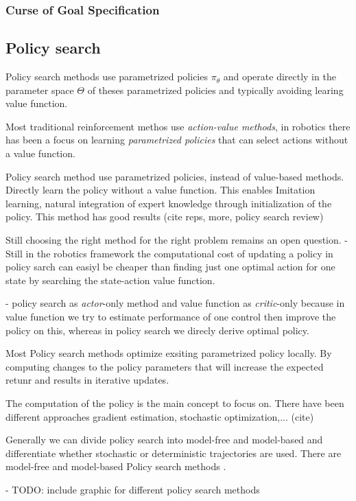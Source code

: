 \subsubsection{Curse of Goal Specification}

\subsection{Policy search}
Policy search methods use parametrized policies $\pi_{\theta}$ and operate
directly in the parameter space $\Theta$ of theses parametrized policies and
typically avoiding learing value function.

Most traditional reinforcement methos use \textit{action-value methods}, in robotics
there has been a focus on learning \textit{parametrized policies} that can select
actions without a value function.

Policy search method use parametrized policies, instead
of value-based methods. Directly learn the policy without a value function.
This enables Imitation learning, natural integration of expert knowledge through
initialization of the policy.
This method has good results (cite reps, more, policy search review)

Still choosing the right method for the right problem remains an open question.
- Still in the robotics framework the computational cost of updating
a policy in policy sarch can easiyl be cheaper than finding just one
optimal action for one state by searching the state-action value function.

- policy search as \textit{actor}-only method and value function as \textit{critic}-only
because in value function we try to estimate performance of one control then improve
the policy on this, whereas in policy search we direcly derive optimal policy.

Most Policy search methods optimize exsiting parametrized policy locally. By computing
changes to the policy parameters that will increase the expected retunr and results
in iterative updates.

The computation of the policy is the main concept to focus on. There have
been different approaches gradient estimation, stochastic optimization,... (cite)

Generally we can divide policy search into model-free and model-based and
differentiate whether stochastic or deterministic trajectories are used.
There are model-free and model-based Policy search methods \citet{deisenroth2013survey}.

- TODO: include graphic for different policy search methods

